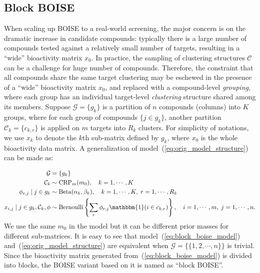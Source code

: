 \documentclass[11pt,a4paper]{article}
\theoremstyle{plain}
\begin{document}
\subsection{Block BOISE}
When scaling up BOISE to a real-world screening, the major concern is on the dramatic increase in candidate compounds: typically there is a large number of compounds tested against a relatively small number of targets, resulting in a ``wide'' bioactivity matrix $x_0$. 
In practice, the sampling of clustering structures $\mathcal C$ can be a challenge for huge number of compounds.
Therefore, the constraint that all compounds share the same target clustering may be eschewed in the presence of a ``wide'' bioactivity matrix $x_0$, and replaced with a compound-level \emph{grouping}, where each group has an individual target-level \emph{clustering} structure shared among its members.
Suppose $\mathcal G = \{g_k\}$ is a partition of $n$ compounds (columns) into $K$ groups, where for each group of compounds $\{j\in g_k\}$, another partition $\mathcal C_k = \{c_{k,r}\}$ is applied on $m$ targets into $R_k$ clusters. 
For simplicity of notations, we use $x_k$ to denote the $k$th sub-matrix defined by $g_k$, where $x_0$ is the whole bioactivity data matrix. 
A generalization of model~(\ref{eq:orig_model_structure}) can be made as:

\begin{align}
\label{eq:block_boise_model}
\begin{split}
\mathcal{G} &= \{g_k\}\\  
\mathcal{C}_k & \sim {\rm CRP}_m(m_0), \quad k=1,\cdots,K\\
\phi_{r,j} \mid j\in g_k & \sim {\rm Beta}(\alpha_k,\beta_k), \quad  k=1,\cdots, K, \; r=1,\cdots, R_k \\
x_{i,j} \mid  j\in g_k, \mathcal{C}_k, \phi  & \sim {\mbox {\rm Bernoulli}} \left\{ \sum_r\phi_{r, j}\mathbbm{1}(i\in c_{k,r}) \right\},
 \quad i=1,\cdots,m, \; j=1,\cdots,n.
\end{split}
\end{align}
We use the same $m_0$ in the model but it can be different prior masses for different sub-matrices. It is easy to see that model~(\ref{eq:block_boise_model}) and~(\ref{eq:orig_model_structure}) are equivalent when $\mathcal G = \{\{1,2,\cdots,n\}\}$ is trivial. Since the bioactivity matrix generated from~(\ref{eq:block_boise_model}) is divided into blocks, the BOISE variant based on it is named as ``block BOISE''.
\end{document}
